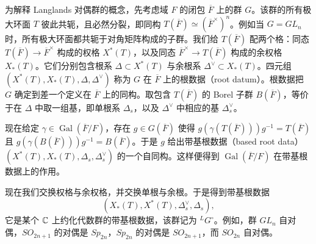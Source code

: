 为解释 Langlands 对偶群的概念，先考虑域 $F$ 的闭包 $\overline{F}$ 上的群 $G$。该群的所有极大环面 $T$ 彼此共轭，且必然分裂，即同构 $T(\overline{F})\simeq(\overline{F}^\times)^n$。例如当 $G=GL_n$ 时，所有极大环面都共轭于对角矩阵构成的子群。我们给 $T(\overline{F})$ 配两个格：同态 $T(\overline{F})\to\overline{F}^\times$ 构成的权格 $X^*(T)$，以及同态 $\overline{F}^\times\to T(\overline{F})$ 构成的余权格 $X_*(T)$。它们分别包含根系 $\Delta\subset X^*(T)$ 与余根系 $\Delta^\vee\subset X_*(T)$。四元组 $(X^*(T),X_*(T),\Delta,\Delta^\vee)$ 称为 $G$ 在 $\overline{F}$ 上的根数据（root datum）。根数据把 $G$ 确定到差一个定义在 $\overline{F}$ 上的同构。取包含 $T(\overline{F})$ 的 Borel 子群 $B(\overline{F})$，等价于在 $\Delta$ 中取一组基，即单根系 $\Delta_s$，以及 $\Delta^\vee$ 中相应的基 $\Delta^\vee_s$。


现在给定 $\gamma\in\operatorname{Gal}(\overline{F}/F)$，存在 $g\in G(\overline{F})$ 使得 $g(\gamma(T(\overline{F})))g^{-1}=T(\overline{F})$ 且 $g(\gamma(B(\overline{F})))g^{-1}=B(\overline{F})$。于是 $g$ 给出带基根数据（based root data）$(X^*(T),X_*(T),\Delta_s,\Delta^\vee_s)$ 的一个自同构。这样便得到 $\operatorname{Gal}(\overline{F}/F)$ 在带基根数据上的作用。


现在我们交换权格与余权格，并交换单根与余根。于是得到带基根数据
\[
    (X_*(T),X^*(T),\Delta^\vee_s,\Delta_s),
\]
它是某个 $\mathbb{C}$ 上约化代数群的带基根数据，该群记为 ${}^L G^\circ$。例如，群 $GL_n$ 自对偶，$SO_{2n+1}$ 的对偶是 $Sp_{2n}$，$Sp_{2n}$ 的对偶是 $SO_{2n+1}$，而 $SO_{2n}$ 自对偶。

